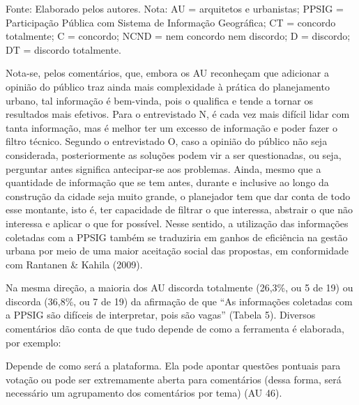 \documentclass{article}
\begin{document}
Fonte: Elaborado pelos autores. Nota: AU = arquitetos e urbanistas;
PPSIG = Participação Pública com Sistema de Informação Geográfica;
CT = concordo totalmente; C = concordo; NCND = nem concordo nem
discordo; D = discordo; DT = discordo totalmente.

Nota-se, pelos comentários, que, embora os AU reconheçam que adicionar a opinião
do público traz ainda mais complexidade à prática do planejamento urbano, tal
informação é bem-vinda, pois o qualifica e tende a tornar os resultados mais
efetivos. Para o entrevistado N, é cada vez mais difícil lidar com tanta
informação, mas é melhor ter um excesso de informação e poder fazer o filtro
técnico. Segundo o entrevistado O, caso a opinião do público não seja
considerada, posteriormente as soluções podem vir a ser questionadas, ou seja,
perguntar antes significa antecipar-se aos problemas. Ainda, mesmo que a
quantidade de informação que se tem antes, durante e inclusive ao longo da
construção da cidade seja muito grande, o planejador tem que dar conta de todo
esse montante, isto é, ter capacidade de filtrar o que interessa, abstrair o que
não interessa e aplicar o que for possível. Nesse sentido, a utilização das
informações coletadas com a PPSIG também se traduziria em ganhos de eficiência
na gestão urbana por meio de uma maior aceitação social das propostas, em
conformidade com Rantanen \& Kahila
(2009).

Na mesma direção, a maioria dos AU discorda totalmente (26,3\%, ou 5 de 19) ou
discorda (36,8\%, ou 7 de 19) da afirmação de que “As informações
coletadas com a PPSIG são difíceis de interpretar, pois são vagas”
(Tabela 5). Diversos comentários dão
conta de que tudo depende de como a ferramenta é elaborada, por exemplo:

Depende de como será a plataforma. Ela pode apontar questões pontuais para
votação ou pode ser extremamente aberta para comentários (dessa forma, será
necessário um agrupamento dos comentários por tema) (AU
46).
\end{document}
